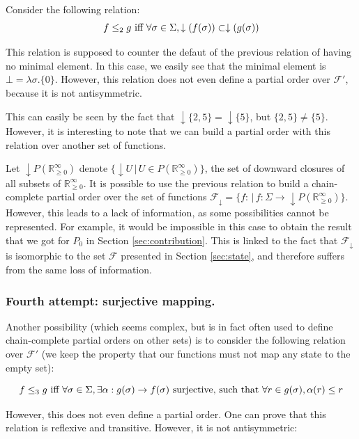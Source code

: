 \documentclass[a4paper,10pt]{llncs}
\def\RRposi {{\mathbb R_{\geq 0}^{\infty}}}
\begin{document}
Consider the following relation:
$$f \leq_2 g \textnormal{ iff } \forall \sigma \in \Sigma, \downarrow(f(\sigma)) \subset \downarrow(g(\sigma))$$

This relation is supposed to counter the defaut of the previous relation of having no minimal element. In this case, we easily see that the minimal element is $\bot = \lambda\sigma.\{0\}$.
However, this relation does not even define a partial order over $\mathcal{F}'$, because it is not antisymmetric.\bigskip

This can easily be seen by the fact that $\downarrow\{2,5\} = \downarrow \{5\}$, but $\{2,5\} \neq \{5\}$. However, it is interesting to note that we can build a partial order with this relation over another set of functions.\bigskip

Let $\downarrow P(\RRposi)$ denote $\{\downarrow U \,|\, U \in P(\RRposi)\}$, the set of downward closures of all subsets of $\RRposi$. It is possible to use the previous relation to build a chain-complete partial order over the set of functions $\mathcal{F}_\downarrow = \{f : \,|\, f : \Sigma \rightarrow \downarrow P(\RRposi)\}$. However, this leads to a lack of information, as some possibilities cannot be represented. For example, it would be impossible in this case to obtain the result that we got for $P_0$ in Section \ref{sec:contribution}. This is linked to the fact that $\mathcal{F}_\downarrow$ is isomorphic to the set $\mathcal{F}$ presented in Section \ref{sec:state}, and therefore suffers from the same loss of information.


\subsubsection{Fourth attempt: surjective mapping.}
Another possibility (which seems complex, but is in fact often used to define chain-complete partial orders on other sets) is to consider the following relation over $\mathcal{F}'$ (we keep the property that our functions must not map any state to the empty set):

$$f \leq_3 g \textnormal{ iff } \forall \sigma \in \Sigma, \exists \alpha : g(\sigma) \rightarrow f(\sigma) \textnormal{ surjective, such that } \forall r \in g(\sigma), \alpha(r) \leq r$$

However, this does not even define a partial order. One can prove that this relation is reflexive and transitive. However, it is not antisymmetric:
\end{document}
